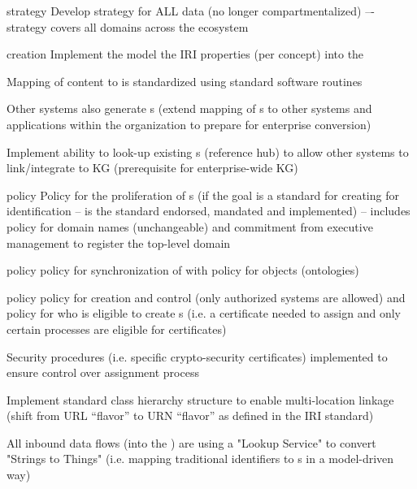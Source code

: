 \kgmmscoringlevelTwo

\begin{scoring}

  \item [strategy] Develop strategy for ALL data (no longer compartmentalized) –- strategy covers all domains across
        the ecosystem
  \item [creation] Implement the model the IRI properties (per concept) into the 
  \item Mapping of content to  is standardized using standard software routines
  \item Other systems also generate s (extend mapping of s to other systems and
        applications within the organization to prepare for enterprise conversion)
  \item Implement ability to look-up existing s (reference hub) to allow other systems to
        link/integrate to KG (prerequisite for enterprise-wide KG)
  \item [policy] Policy for the proliferation of s (if the goal is a standard for creating for
        identification -- is the standard endorsed, mandated and implemented) -- includes policy
        for domain names (unchangeable) and commitment from executive management to register the top-level domain
  \item [policy] policy for synchronization of  with policy for objects (ontologies)
  \item [policy] policy for creation and control (only authorized systems are allowed) and policy for who is
        eligible to create s (i.e. a certificate needed to assign and only certain processes are
        eligible for certificates)

\end{scoring}

\kgmmscoringlevelThree

\begin{scoring}

  \item Security procedures (i.e. specific crypto-security certificates) implemented to ensure control over
         assignment process
  \item Implement standard  class hierarchy structure to enable multi-location linkage (shift from
        URL “flavor” to URN “flavor” as defined in the IRI standard)
  \item All inbound data flows (into the ) are using a "Lookup Service" to convert "Strings to Things"
        (i.e. mapping traditional identifiers to s in a model-driven way)

\end{scoring}
